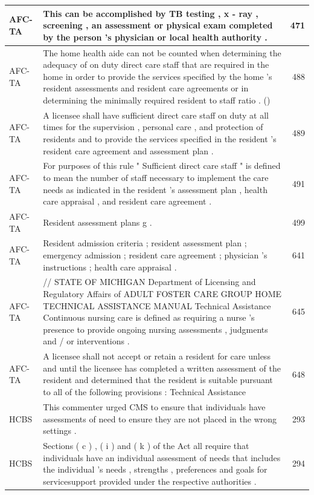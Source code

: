 \documentclass[
]{book}
\begin{document}
\begin{tabular}{l|l|r}
\hline
AFC-TA & This can be accomplished by TB testing , x - ray , screening , an assessment or physical exam completed by the person 's physician or local health authority . & 471\\
\hline
AFC-TA & The home health aide can not be counted when determining the adequacy of on duty direct care staff that are required in the home in order to provide the services specified by the home 's resident assessments and resident care agreements or in determining the minimally required resident to staff ratio . () & 488\\
\hline
AFC-TA & A licensee shall have sufficient direct care staff on duty at all times for the supervision , personal care , and protection of residents and to provide the services specified in the resident 's resident care agreement and assessment plan . & 489\\
\hline
AFC-TA & For purposes of this rule " Sufficient direct care staff " is defined to mean the number of staff necessary to implement the care needs as indicated in the resident 's assessment plan , health care appraisal , and resident care agreement . & 491\\
\hline
AFC-TA & Resident assessment plans g . & 499\\
\hline
AFC-TA & Resident admission criteria ; resident assessment plan ; emergency admission ; resident care agreement ; physician 's instructions ; health care appraisal . & 641\\
\hline
AFC-TA & // STATE OF MICHIGAN Department of Licensing and Regulatory Affairs of ADULT FOSTER CARE GROUP HOME TECHNICAL ASSISTANCE MANUAL Technical Assistance Continuous nursing care is defined as requiring a nurse 's presence to provide ongoing nursing assessments , judgments and / or interventions . & 645\\
\hline
AFC-TA & A licensee shall not accept or retain a resident for care unless and until the licensee has completed a written assessment of the resident and determined that the resident is suitable pursuant to all of the following provisions : Technical Assistance & 648\\
\hline
HCBS & This commenter urged CMS to ensure that individuals have assessments of need to ensure they are not placed in the wrong settings . & 293\\
\hline
HCBS & Sections ( c ) , ( i ) and ( k ) of the Act all require that individuals have an individual assessment of needs that includes the individual 's needs , strengths , preferences and goals for servicesupport provided under the respective authorities . & 294\\

\end{tabular}
\end{document}
